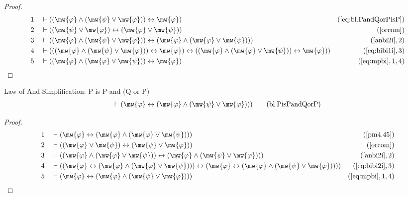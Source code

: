 \begin{proof}
\begin{align}
  1 &&  & \vdash ( ( \mw{\varphi} \wedge ( \mw{\psi} \vee \mw{\varphi} ) ) \leftrightarrow \mw{\varphi} )&(\mbox{\ref{eq:bl.PandQorPisP}})\notag
  \\ 2 &&  & \vdash ( ( \mw{\psi} \vee \mw{\varphi} ) \leftrightarrow ( \mw{\varphi} \vee \mw{\psi} ) )&(\mbox{\ref{orcom}})\notag
  \\ 3 &&  & \vdash ( ( \mw{\varphi} \wedge ( \mw{\psi} \vee \mw{\varphi} ) ) \leftrightarrow ( \mw{\varphi} \wedge ( \mw{\varphi} \vee \mw{\psi} ) ) )&(\mbox{\ref{anbi2i}},2)\notag
  \\ 4 &&  & \vdash ( ( ( \mw{\varphi} \wedge ( \mw{\psi} \vee \mw{\varphi} ) ) \leftrightarrow \mw{\varphi} ) \leftrightarrow ( ( \mw{\varphi} \wedge ( \mw{\varphi} \vee \mw{\psi} ) ) \leftrightarrow \mw{\varphi} ) )&(\mbox{\ref{eq:bibi1i}},3)\notag
  \\ 5 &&  & \vdash ( ( \mw{\varphi} \wedge ( \mw{\varphi} \vee \mw{\psi} ) ) \leftrightarrow \mw{\varphi} )&(\mbox{\ref{eq:mpbi}},1,4)\notag
\end{align}
\end{proof}

\begin{lemma} Law of And-Simplification: P is P
and (Q or P)
\begin{align}
\vdash ( \mw{\varphi} \leftrightarrow ( \mw{\varphi} \wedge ( \mw{\psi} \vee
    \mw{\varphi} ) ) )\label{eq:bl.PisPandQorP}\tag{bl.PisPandQorP}
\end{align}
\end{lemma}

\begin{proof}
\begin{align}
  1 &&  & \vdash ( \mw{\varphi} \leftrightarrow ( \mw{\varphi} \wedge ( \mw{\varphi} \vee \mw{\psi} ) ) )&(\mbox{\ref{pm4.45}})\notag
  \\ 2 &&  & \vdash ( ( \mw{\varphi} \vee \mw{\psi} ) \leftrightarrow ( \mw{\psi} \vee \mw{\varphi} ) )&(\mbox{\ref{orcom}})\notag
  \\ 3 &&  & \vdash ( ( \mw{\varphi} \wedge ( \mw{\varphi} \vee \mw{\psi} ) ) \leftrightarrow ( \mw{\varphi} \wedge ( \mw{\psi} \vee \mw{\varphi} ) ) )&(\mbox{\ref{anbi2i}},2)\notag
  \\ 4 &&  & \vdash ( ( \mw{\varphi} \leftrightarrow ( \mw{\varphi} \wedge ( \mw{\varphi} \vee \mw{\psi} ) ) ) \leftrightarrow ( \mw{\varphi} \leftrightarrow ( \mw{\varphi} \wedge ( \mw{\psi} \vee \mw{\varphi} ) ) ) )&(\mbox{\ref{eq:bibi2i}},3)\notag
  \\ 5 &&  & \vdash ( \mw{\varphi} \leftrightarrow ( \mw{\varphi} \wedge ( \mw{\psi} \vee \mw{\varphi} ) ) )&(\mbox{\ref{eq:mpbi}},1,4)\notag
\end{align}
\end{proof}

